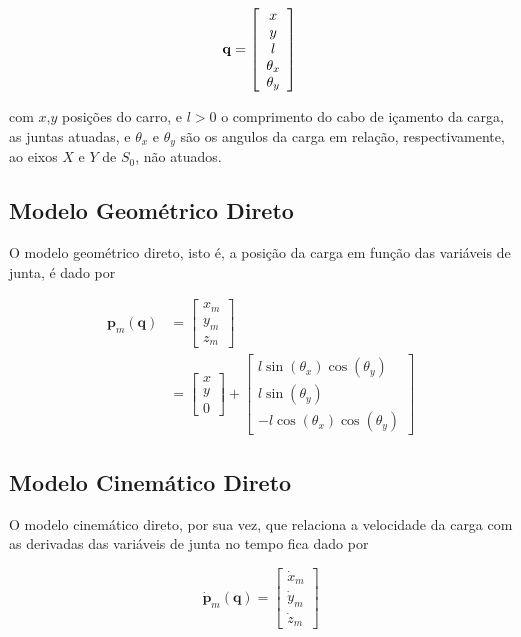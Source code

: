 \documentclass{ppgeesa}
\begin{document}
\begin{equation}
\mathbf{q}
= 
\left[
\begin{array}{c}
x\\
y\\
l\\
\theta_x\\ 
\theta_y
\end{array} 
\right]\\
\end{equation}

\noindent com $x$,$y$ posições do carro, e $l>0$ o comprimento do cabo de içamento da carga, as juntas atuadas, e $\theta_x$ e $\theta_y$ são os angulos da carga em relação, respectivamente, ao eixos $X$ e $Y$ de $S_0$, não atuados.

\subsection{Modelo Geométrico Direto}

O modelo geométrico direto, isto é, a posição da carga em função das variáveis de junta, é dado por

\begin{align}
  \mathbf{p}_m(\mathbf{q})
&= 
\left[
\begin{array}{c}
x_m\\
y_m\\
z_m
\end{array} 
\right]\\
&=
\left[
\begin{array}{c}
x\\
y\\
0
\end{array} 
\right]
+
\left[
\begin{array}{c}
l\sin(\theta_x)\cos(\theta_y)\\
l\sin(\theta_y)\\
-l\cos(\theta_x)\cos(\theta_y)
\end{array} 
\right]
\label{eq:mass_position}
\end{align}

\subsection{Modelo Cinemático Direto}

O modelo cinemático direto, por sua vez, que relaciona a velocidade da carga com as derivadas das variáveis de junta no tempo fica dado por

\begin{equation}
\dot{\mathbf{p}}_m(\mathbf{q})
= 
\left[
  \begin{array}{c}
    \dot{x}_m\\
    \dot{y}_m\\
    \dot{z}_m
  \end{array} 
\right]
\end{equation}
\end{document}

